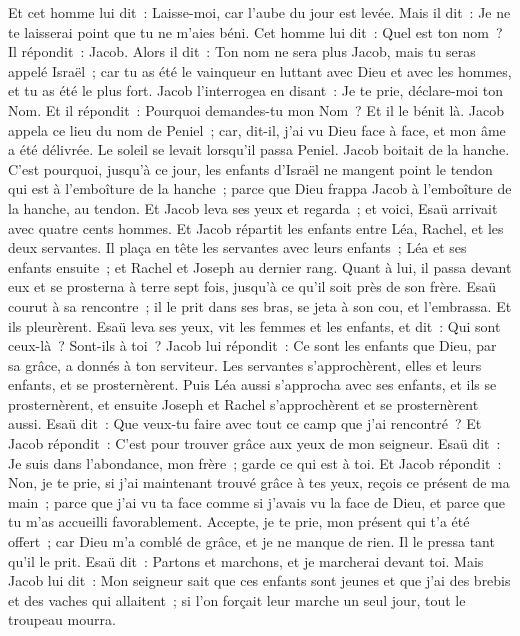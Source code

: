 \begin{multicols}{2}
Et cet homme lui dit~: Laisse-moi, car l'aube du jour est levée. Mais il dit~: Je ne te laisserai point que tu ne m'aies béni.
Cet homme lui dit~: Quel est ton nom~? Il répondit~: Jacob.
Alors il dit~: Ton nom ne sera plus Jacob, mais tu seras appelé Israël~; car tu as été le vainqueur en luttant avec Dieu et avec les hommes, et tu as été le plus fort.
Jacob l'interrogea en disant~: Je te prie, déclare-moi ton Nom. Et il répondit~: Pourquoi demandes-tu mon Nom~? Et il le bénit là.
Jacob appela ce lieu du nom de Peniel~; car, dit-il, j'ai vu Dieu face à face, et mon âme a été délivrée.
Le soleil se levait lorsqu'il passa Peniel. Jacob boitait de la hanche.
C'est pourquoi, jusqu'à ce jour, les enfants d'Israël ne mangent point le tendon qui est à l'emboîture de la hanche~; parce que Dieu frappa Jacob à l'emboîture de la hanche, au tendon.
\VerseOne{}Et Jacob leva ses yeux et regarda~; et voici, Esaü arrivait avec quatre cents hommes. Et Jacob répartit les enfants entre Léa, Rachel, et les deux servantes.
Il plaça en tête les servantes avec leurs enfants~; Léa et ses enfants ensuite~; et Rachel et Joseph au dernier rang.
Quant à lui, il passa devant eux et se prosterna à terre sept fois, jusqu'à ce qu'il soit près de son frère.
Esaü courut à sa rencontre~; il le prit dans ses bras, se jeta à son cou, et l'embrassa. Et ils pleurèrent.
Esaü leva ses yeux, vit les femmes et les enfants, et dit~: Qui sont ceux-là~? Sont-ils à toi~? Jacob lui répondit~: Ce sont les enfants que Dieu, par sa grâce, a donnés à ton serviteur.
Les servantes s'approchèrent, elles et leurs enfants, et se prosternèrent.
Puis Léa aussi s'approcha avec ses enfants, et ils se prosternèrent, et ensuite Joseph et Rachel s'approchèrent et se prosternèrent aussi.
Esaü dit~: Que veux-tu faire avec tout ce camp que j'ai rencontré~? Et Jacob répondit~: C'est pour trouver grâce aux yeux de mon seigneur.
Esaü dit~: Je suis dans l'abondance, mon frère~; garde ce qui est à toi.
Et Jacob répondit~: Non, je te prie, si j'ai maintenant trouvé grâce à tes yeux, reçois ce présent de ma main~; parce que j'ai vu ta face comme si j'avais vu la face de Dieu, et parce que tu m'as accueilli favorablement.
Accepte, je te prie, mon présent qui t'a été offert~; car Dieu m'a comblé de grâce, et je ne manque de rien. Il le pressa tant qu'il le prit.
Esaü dit~: Partons et marchons, et je marcherai devant toi.
Mais Jacob lui dit~: Mon seigneur sait que ces enfants sont jeunes et que j'ai des brebis et des vaches qui allaitent~; si l'on forçait leur marche un seul jour, tout le troupeau mourra.

\end{multicols}
